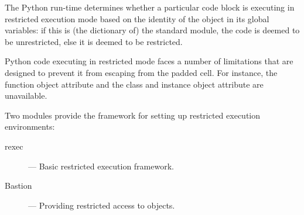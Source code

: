 The Python run-time determines whether a particular code block is
executing in restricted execution mode based on the identity of the
 object in its global variables: if this is (the
dictionary of) the standard  module, the code is
deemed to be unrestricted, else it is deemed to be restricted.

Python code executing in restricted mode faces a number of limitations
that are designed to prevent it from escaping from the padded cell.
For instance, the function object attribute  and the
class and instance object attribute  are unavailable.

Two modules provide the framework for setting up restricted execution
environments:

\begin{description}

\item[rexec]
--- Basic restricted execution framework.

\item[Bastion]
--- Providing restricted access to objects.

\end{description}

\begin{seealso}
\end{seealso}
